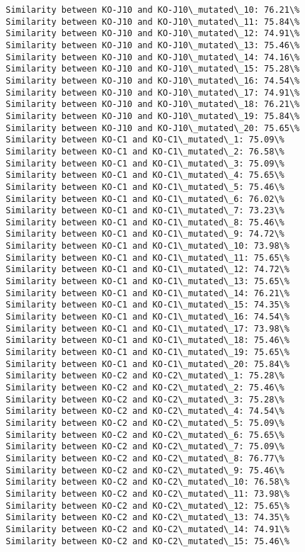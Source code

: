\documentclass[11pt]{article}
\begin{document}
\begin{Verbatim}[commandchars=\\\{\}]
Similarity between KO-J10 and KO-J10\_mutated\_10: 76.21\%
Similarity between KO-J10 and KO-J10\_mutated\_11: 75.84\%
Similarity between KO-J10 and KO-J10\_mutated\_12: 74.91\%
Similarity between KO-J10 and KO-J10\_mutated\_13: 75.46\%
Similarity between KO-J10 and KO-J10\_mutated\_14: 74.16\%
Similarity between KO-J10 and KO-J10\_mutated\_15: 75.28\%
Similarity between KO-J10 and KO-J10\_mutated\_16: 74.54\%
Similarity between KO-J10 and KO-J10\_mutated\_17: 74.91\%
Similarity between KO-J10 and KO-J10\_mutated\_18: 76.21\%
Similarity between KO-J10 and KO-J10\_mutated\_19: 75.84\%
Similarity between KO-J10 and KO-J10\_mutated\_20: 75.65\%
Similarity between KO-C1 and KO-C1\_mutated\_1: 75.09\%
Similarity between KO-C1 and KO-C1\_mutated\_2: 76.58\%
Similarity between KO-C1 and KO-C1\_mutated\_3: 75.09\%
Similarity between KO-C1 and KO-C1\_mutated\_4: 75.65\%
Similarity between KO-C1 and KO-C1\_mutated\_5: 75.46\%
Similarity between KO-C1 and KO-C1\_mutated\_6: 76.02\%
Similarity between KO-C1 and KO-C1\_mutated\_7: 73.23\%
Similarity between KO-C1 and KO-C1\_mutated\_8: 75.46\%
Similarity between KO-C1 and KO-C1\_mutated\_9: 74.72\%
Similarity between KO-C1 and KO-C1\_mutated\_10: 73.98\%
Similarity between KO-C1 and KO-C1\_mutated\_11: 75.65\%
Similarity between KO-C1 and KO-C1\_mutated\_12: 74.72\%
Similarity between KO-C1 and KO-C1\_mutated\_13: 75.65\%
Similarity between KO-C1 and KO-C1\_mutated\_14: 76.21\%
Similarity between KO-C1 and KO-C1\_mutated\_15: 74.35\%
Similarity between KO-C1 and KO-C1\_mutated\_16: 74.54\%
Similarity between KO-C1 and KO-C1\_mutated\_17: 73.98\%
Similarity between KO-C1 and KO-C1\_mutated\_18: 75.46\%
Similarity between KO-C1 and KO-C1\_mutated\_19: 75.65\%
Similarity between KO-C1 and KO-C1\_mutated\_20: 75.84\%
Similarity between KO-C2 and KO-C2\_mutated\_1: 75.28\%
Similarity between KO-C2 and KO-C2\_mutated\_2: 75.46\%
Similarity between KO-C2 and KO-C2\_mutated\_3: 75.28\%
Similarity between KO-C2 and KO-C2\_mutated\_4: 74.54\%
Similarity between KO-C2 and KO-C2\_mutated\_5: 75.09\%
Similarity between KO-C2 and KO-C2\_mutated\_6: 75.65\%
Similarity between KO-C2 and KO-C2\_mutated\_7: 75.09\%
Similarity between KO-C2 and KO-C2\_mutated\_8: 76.77\%
Similarity between KO-C2 and KO-C2\_mutated\_9: 75.46\%
Similarity between KO-C2 and KO-C2\_mutated\_10: 76.58\%
Similarity between KO-C2 and KO-C2\_mutated\_11: 73.98\%
Similarity between KO-C2 and KO-C2\_mutated\_12: 75.65\%
Similarity between KO-C2 and KO-C2\_mutated\_13: 74.35\%
Similarity between KO-C2 and KO-C2\_mutated\_14: 74.91\%
Similarity between KO-C2 and KO-C2\_mutated\_15: 75.46\%

\end{Verbatim}
\end{document}
